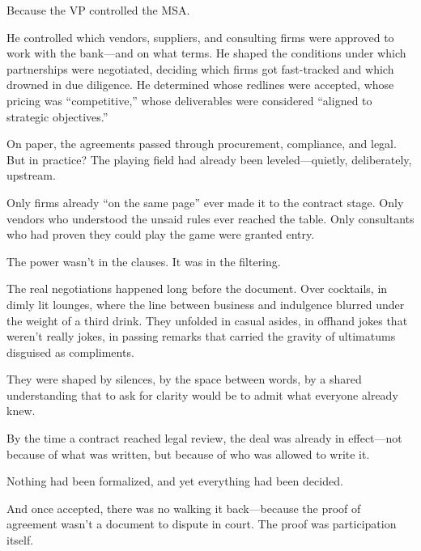 Because the VP controlled the MSA.

He controlled which vendors, suppliers, and consulting firms were approved to work with the bank—and on what terms.  
He shaped the conditions under which partnerships were negotiated, deciding which firms got fast-tracked and which drowned in due diligence.  
He determined whose redlines were accepted, whose pricing was “competitive,” whose deliverables were considered “aligned to strategic objectives.”

On paper, the agreements passed through procurement, compliance, and legal. But in practice?  
The playing field had already been leveled—quietly, deliberately, upstream.

Only firms already “on the same page” ever made it to the contract stage.  
Only vendors who understood the unsaid rules ever reached the table.  
Only consultants who had proven they could play the game were granted entry.

The power wasn’t in the clauses. It was in the filtering.

The real negotiations happened long before the document.  
Over cocktails, in dimly lit lounges, where the line between business and indulgence blurred under the weight of a third drink.  
They unfolded in casual asides, in offhand jokes that weren’t really jokes, in passing remarks that carried the gravity of ultimatums disguised as compliments.

They were shaped by silences, by the space between words, by a shared understanding that to ask for clarity would be to admit what everyone already knew.

By the time a contract reached legal review, the deal was already in effect—not because of what was written, but because of who was allowed to write it.

Nothing had been formalized, and yet everything had been decided.

And once accepted, there was no walking it back—because the proof of agreement wasn’t a document to dispute in court.  
The proof was participation itself.



